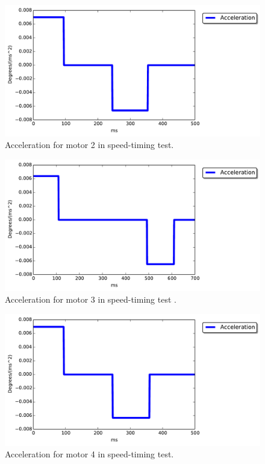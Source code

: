 \begin{figure}[ht]
\includegraphics[width=\textwidth]{test_res/speed_tests/Acc_motor2.pdf}
\caption{Acceleration for motor 2 in speed-timing test.}
\label{fig:acc_2}
\end{figure}

\begin{figure}[ht]
\includegraphics[width=\textwidth]{test_res/speed_tests/Acc_motor3.pdf}
\caption{Acceleration for motor 3 in speed-timing test .}
\label{fig:acc_3}
\end{figure}

\begin{figure}[ht]
\includegraphics[width=\textwidth]{test_res/speed_tests/Acc_motor4.pdf}
\caption{Acceleration for motor 4 in speed-timing test.}
\label{fig:acc_4}
\end{figure}

